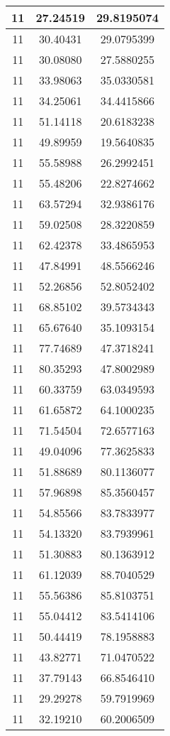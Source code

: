 \documentclass[
]{book}
\begin{document}
\begin{tabular}{c|c|c}
\hline
11 & 27.24519 & 29.8195074\\
\hline
11 & 30.40431 & 29.0795399\\
\hline
11 & 30.08080 & 27.5880255\\
\hline
11 & 33.98063 & 35.0330581\\
\hline
11 & 34.25061 & 34.4415866\\
\hline
11 & 51.14118 & 20.6183238\\
\hline
11 & 49.89959 & 19.5640835\\
\hline
11 & 55.58988 & 26.2992451\\
\hline
11 & 55.48206 & 22.8274662\\
\hline
11 & 63.57294 & 32.9386176\\
\hline
11 & 59.02508 & 28.3220859\\
\hline
11 & 62.42378 & 33.4865953\\
\hline
11 & 47.84991 & 48.5566246\\
\hline
11 & 52.26856 & 52.8052402\\
\hline
11 & 68.85102 & 39.5734343\\
\hline
11 & 65.67640 & 35.1093154\\
\hline
11 & 77.74689 & 47.3718241\\
\hline
11 & 80.35293 & 47.8002989\\
\hline
11 & 60.33759 & 63.0349593\\
\hline
11 & 61.65872 & 64.1000235\\
\hline
11 & 71.54504 & 72.6577163\\
\hline
11 & 49.04096 & 77.3625833\\
\hline
11 & 51.88689 & 80.1136077\\
\hline
11 & 57.96898 & 85.3560457\\
\hline
11 & 54.85566 & 83.7833977\\
\hline
11 & 54.13320 & 83.7939961\\
\hline
11 & 51.30883 & 80.1363912\\
\hline
11 & 61.12039 & 88.7040529\\
\hline
11 & 55.56386 & 85.8103751\\
\hline
11 & 55.04412 & 83.5414106\\
\hline
11 & 50.44419 & 78.1958883\\
\hline
11 & 43.82771 & 71.0470522\\
\hline
11 & 37.79143 & 66.8546410\\
\hline
11 & 29.29278 & 59.7919969\\
\hline
11 & 32.19210 & 60.2006509\\

\end{tabular}
\end{document}
